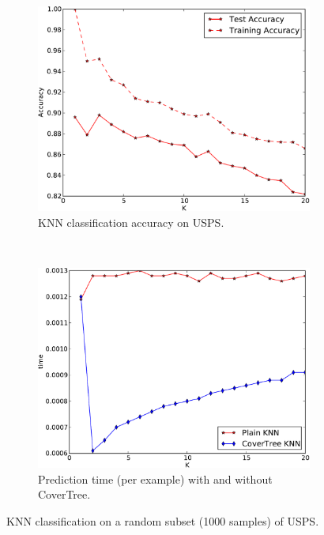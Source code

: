 \begin{figure}\centering
	\begin{subfigure}{.48\textwidth}
		\includegraphics[width=\textwidth]{fig/multiclass/knn-accuracy}
		\caption{KNN classification accuracy on USPS.}
		\label{fig:mc-knn-acc}
	\end{subfigure}
	~
	\begin{subfigure}{.48\textwidth}
		\includegraphics[width=\textwidth]{fig/multiclass/knn-time}
		\caption{Prediction time (per example) with and without CoverTree.}
		\label{fig:mc-knn-time}
	\end{subfigure}
	\caption{KNN classification on a random subset (1000 samples) of USPS.}
\end{figure}

